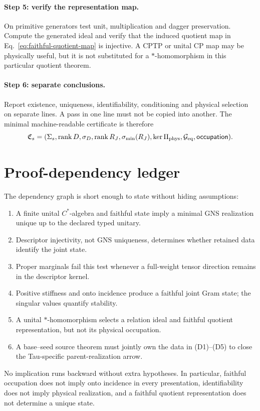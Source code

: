 \documentclass[11pt]{article}
\begin{document}
\paragraph{Step 5: verify the representation map.}
On primitive generators test unit, multiplication and dagger preservation.
Compute the generated ideal and verify that the induced quotient map in
Eq.~\eqref{eq:faithful-quotient-map} is injective.  A CPTP or unital CP map may
be physically useful, but it is not substituted for a \(*\)-homomorphism in
this particular quotient theorem.

\paragraph{Step 6: separate conclusions.}
Report existence, uniqueness, identifiability, conditioning and physical
selection on separate lines.  A pass in one line must not be copied into
another.  The minimal machine-readable certificate is therefore
\begin{equation}
 \mathfrak C_s=
 (\Sigma_s,\operatorname{rank}D,\sigma_D,
  \operatorname{rank}R_J,\sigma_{\min}(R_J),
  \ker\Pi_{\rm phys},\mathcal G_{\rm eq},\mathsf{occupation}).
 \label{eq:finite-certificate}
\end{equation}

\section{Proof-dependency ledger}

The dependency graph is short enough to state without hiding assumptions:
\begin{enumerate}[label=(D\arabic*)]
 \item A finite unital \(C^*\)-algebra and faithful state imply a minimal GNS
 realization unique up to the declared typed unitary.
 \item Descriptor injectivity, not GNS uniqueness, determines whether retained
 data identify the joint state.
 \item Proper marginals fail this test whenever a full-weight tensor direction
 remains in the descriptor kernel.
 \item Positive stiffness and onto incidence produce a faithful joint Gram
 state; the singular values quantify stability.
 \item A unital \(*\)-homomorphism selects a relation ideal and faithful
 quotient representation, but not its physical occupation.
 \item A base--seed source theorem must jointly own the data in (D1)--(D5) to
 close the Tau-specific parent-realization arrow.
\end{enumerate}

No implication runs backward without extra hypotheses.  In particular,
faithful occupation does not imply onto incidence in every presentation,
identifiability does not imply physical realization, and a faithful quotient
representation does not determine a unique state.




\end{document}
